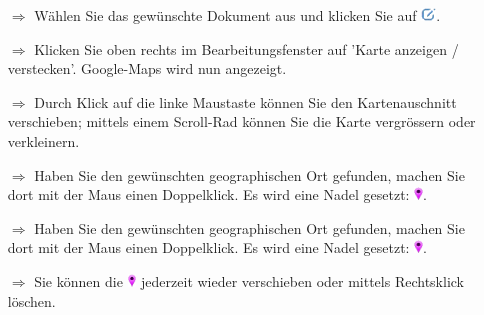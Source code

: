 \documentclass{article}
\begin{document}
\begin{multicols}{2}
\begin{tcolorbox}[colback=blue!5,colframe=blue!40!black,title=Dokumente mit Google-Maps verknüpfen]
\begin{itemize}
  \item[$\Longrightarrow$] Wählen Sie das gewünschte Dokument aus und klicken Sie auf  \includegraphics[height=10pt]{Icons/bearbeiten.png}.
  \item[$\Longrightarrow$] Klicken Sie oben rechts im Bearbeitungsfenster auf 'Karte anzeigen / verstecken'. Google-Maps wird nun angezeigt.
  \item[$\Longrightarrow$] Durch Klick auf die linke Maustaste können Sie den Kartenauschnitt verschieben; mittels einem Scroll-Rad können Sie die Karte vergrössern oder verkleinern.
  \item[$\Longrightarrow$] Haben Sie den gewünschten geographischen Ort gefunden, machen Sie dort mit der Maus einen Doppelklick. Es wird eine Nadel gesetzt: \includegraphics[height=10pt]{Icons/vNadel.png}.
  \item[$\Longrightarrow$] Haben Sie den gewünschten geographischen Ort gefunden, machen Sie dort mit der Maus einen Doppelklick. Es wird eine Nadel gesetzt: \includegraphics[height=10pt]{Icons/vNadel.png}.
	\item[$\Longrightarrow$] Sie können die \includegraphics[height=10pt]{Icons/vNadel.png} jederzeit wieder verschieben oder mittels Rechtsklick löschen.
\end{itemize}
\end{tcolorbox}


\end{multicols}

\end{document}
